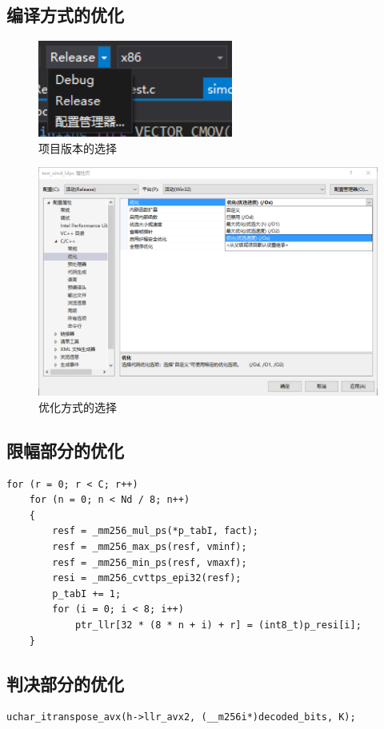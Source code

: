 \documentclass{article}
\begin{document}
\subsection{编译方式的优化}
\begin{figure}[H]
	\centering
	\includegraphics[width = .4\textwidth]{release.png}
	\caption{项目版本的选择}
\end{figure}
\begin{figure}[H]
	\centering
	\includegraphics[width = .8\textwidth]{ox.png}
	\caption{优化方式的选择}
\end{figure}

\subsection{限幅部分的优化}
\lstset{language=C++}
\begin{lstlisting}
for (r = 0; r < C; r++)
	for (n = 0; n < Nd / 8; n++)
	{
		resf = _mm256_mul_ps(*p_tabI, fact);
		resf = _mm256_max_ps(resf, vminf);
		resf = _mm256_min_ps(resf, vmaxf);
		resi = _mm256_cvttps_epi32(resf);
		p_tabI += 1;
		for (i = 0; i < 8; i++)
			ptr_llr[32 * (8 * n + i) + r] = (int8_t)p_resi[i];
	}
\end{lstlisting}

\subsection{判决部分的优化}
\begin{lstlisting}
uchar_itranspose_avx(h->llr_avx2, (__m256i*)decoded_bits, K);
\end{lstlisting}
\end{document}
